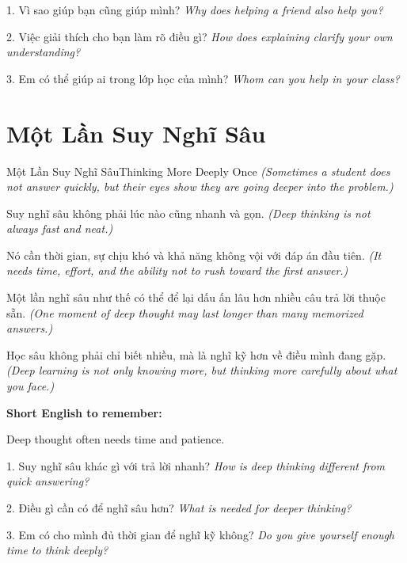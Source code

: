 \begin{tuhocnhanh}
1. Vì sao giúp bạn cũng giúp mình? \textit{Why does helping a friend also help you?}

2. Việc giải thích cho bạn làm rõ điều gì? \textit{How does explaining clarify your own understanding?}

3. Em có thể giúp ai trong lớp học của mình? \textit{Whom can you help in your class?}
\end{tuhocnhanh}
\ngancach

\section{Một Lần Suy Nghĩ Sâu}
\begin{truyen}{Một Lần Suy Nghĩ Sâu}{Thinking More Deeply Once}
\textit{(Sometimes a student does not answer quickly, but their eyes show they are going deeper into the problem.)}

Suy nghĩ sâu không phải lúc nào cũng nhanh và gọn.
\textit{(Deep thinking is not always fast and neat.)}

Nó cần thời gian, sự chịu khó và khả năng không vội với đáp án đầu tiên.
\textit{(It needs time, effort, and the ability not to rush toward the first answer.)}

Một lần nghĩ sâu như thế có thể để lại dấu ấn lâu hơn nhiều câu trả lời thuộc sẵn.
\textit{(One moment of deep thought may last longer than many memorized answers.)}
\end{truyen}

\begin{baihoc}
Học sâu không phải chỉ biết nhiều, mà là nghĩ kỹ hơn về điều mình đang gặp.
\textit{(Deep learning is not only knowing more, but thinking more carefully about what you face.)}
\end{baihoc}

\begin{ghinhoanh}
\textbf{Short English to remember:}

Deep thought often needs time and patience.

\end{ghinhoanh}

\begin{tuhocnhanh}
1. Suy nghĩ sâu khác gì với trả lời nhanh? \textit{How is deep thinking different from quick answering?}

2. Điều gì cần có để nghĩ sâu hơn? \textit{What is needed for deeper thinking?}

3. Em có cho mình đủ thời gian để nghĩ kỹ không? \textit{Do you give yourself enough time to think deeply?}
\end{tuhocnhanh}
\ngancach

